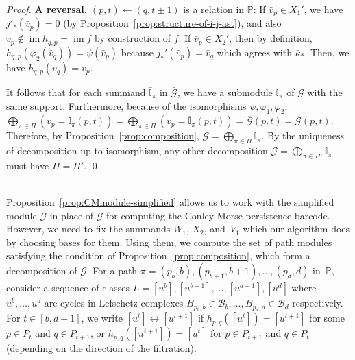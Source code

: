 \documentclass[letterpaper,11pt]{article}
\theoremstyle{plain}
\theoremstyle{definition}
\renewcommand{\phi}{\varphi}
\newcommand{\im}{\operatorname{im}}
\newcounter{li}
\begin{document}
\begin{proof}
    \textbf{A reversal.} $(p,t)\leftarrow (q,t\pm 1)$ is a relation in $\mathbb P$: 
        If $\bar v_p\in X_1'$, we have $j'_\ast(\bar v_p)=0$ (by Proposition~\ref{prop:structure-of-i-j-ast}), 
            and also $v_p\not\in\im h_{q,p}=\im f$ by construction of $f$. 
    If $\bar v_p\in X_2'$, then by definition,
        $h_{q,p}(\phi_2(\bar v_q))=\psi(\bar v_p)$ because $j_\ast'(\bar v_p)=\bar v_q$ which agrees with $\bar{\kappa}_\ast$.
        Then, we have $h_{q,p}(v_q)=v_p$.
        

    It follows that for each summand $\bar{\mathbb{I}}_\pi$ in $\bar{\mathcal G}$, we have a submodule $\mathbb{I}_\pi$ of $\mathcal G$ with the same support. Furthermore, because of the isomorphisms $\psi,\phi_1,\phi_2$,
    $\bigoplus_{\pi\in \Pi} (v_p=\mathbb I_\pi(p,t))=\bigoplus_{\pi\in \Pi}(\bar v_p= \overline{\mathbb{I}}_\pi(p,t))=\overline{\mathcal G}(p,t)=\mathcal{G}(p,t)$.
    Therefore, by Proposition~\ref{prop:composition}, $\mathcal G=\bigoplus_{\pi\in \Pi} \mathbb I_\pi$. By the uniqueness of decomposition up to isomorphism,
    any other decomposition $\mathcal G=\bigoplus_{\pi\in \Pi'}\mathbb I_\pi$ must have
    $\Pi=\Pi'$. \qed
\end{proof}
~\\
Proposition~\ref{prop:CMmodule-simplified} allows us to work with the simplified
module $\mathcal G$ in place of $\overline{\mathcal G}$ for computing the Conley-Morse
persistence barcode. However, we need to fix the  summands $W_1$, $X_2$, and~$V_1$ which our algorithm
does by choosing bases for them. Using them,
we compute the set of path modules satisfying the condition
of Proposition~\ref{prop:composition}, which form a decomposition of $\mathcal G$.
For a path $\pi=(p_b,b),(p_{b+1},b+1),\ldots,(p_d,d)$ in~$\mathbb{P}$, consider
a sequence of classes $L=[u^b],[u^{b+1}],\ldots,[u^{d-1}],[u^d]$ where $u^b,\ldots,u^d$
are cycles in Lefschetz complexes $B_{p_b,b}\in {\mathcal B}_b,\ldots,B_{p_d,d}\in {\mathcal B}_d$ respectively.
For $t\in [b,d-1]$, we write $[u^t]\leftrightarrow [u^{t+1}]$ if $h_{p,q}([u^t])=[u^{t+1}]$ for some $p\in P_t$ and $q\in P_{t+1}$, or $h_{p,q}([u^{t+1}])=[u^t]$ for $p\in P_{t+1}$ and $q\in P_t$ (depending on the direction of the filtration). 
\end{document}
